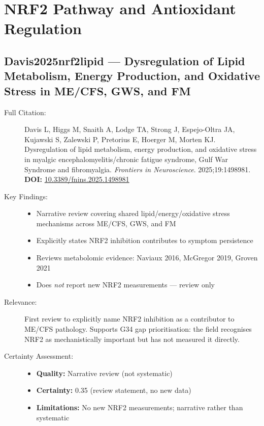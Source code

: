 
\section{NRF2 Pathway and Antioxidant Regulation}

\subsection*{Davis2025nrf2lipid --- Dysregulation of Lipid Metabolism, Energy Production, and Oxidative Stress in ME/CFS, GWS, and FM}
\begin{description}
    \item[Full Citation:] Davis L, Higgs M, Snaith A, Lodge TA, Strong J, Espejo-Oltra JA, Kujawski S, Zalewski P, Pretorius E, Hoerger M, Morten KJ. Dysregulation of lipid metabolism, energy production, and oxidative stress in myalgic encephalomyelitis/chronic fatigue syndrome, Gulf War Syndrome and fibromyalgia. \textit{Frontiers in Neuroscience}. 2025;19:1498981.\\
    \textbf{DOI:} \href{https://doi.org/10.3389/fnins.2025.1498981}{10.3389/fnins.2025.1498981}
    \item[Key Findings:]
    \begin{itemize}
        \item Narrative review covering shared lipid/energy/oxidative stress mechanisms across ME/CFS, GWS, and FM
        \item Explicitly states NRF2 inhibition contributes to symptom persistence
        \item Reviews metabolomic evidence: Naviaux 2016, McGregor 2019, Groven 2021
        \item Does \emph{not} report new NRF2 measurements --- review only
    \end{itemize}
    \item[Relevance:] First review to explicitly name NRF2 inhibition as a contributor to ME/CFS pathology. Supports G34 gap prioritisation: the field recognises NRF2 as mechanistically important but has not measured it directly.
    \item[Certainty Assessment:]
    \begin{itemize}
        \item \textbf{Quality:} Narrative review (not systematic)
        \item \textbf{Certainty:} 0.35 (review statement, no new data)
        \item \textbf{Limitations:} No new NRF2 measurements; narrative rather than systematic
    \end{itemize}
\end{description}


